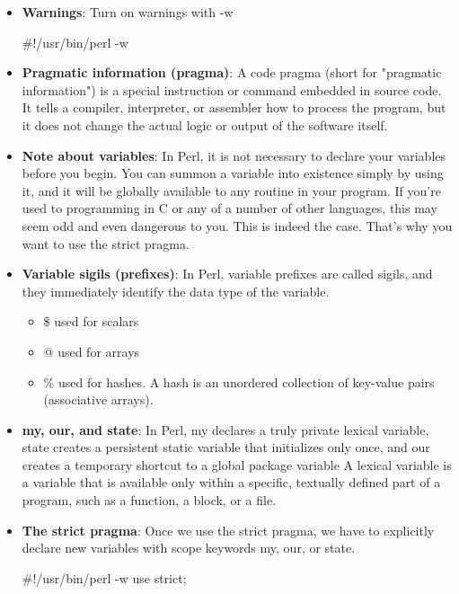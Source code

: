\documentclass{report}
\begin{document}
    \pagebreak 
    \begin{itemize}
        \item \textbf{Warnings}: Turn on warnings with -w
            \begin{perlcode}
                #!/usr/bin/perl -w
            \end{perlcode}

    \end{itemize}

    \pagebreak 
    \begin{itemize}
        \item \textbf{Pragmatic information (pragma)}: A code pragma (short for "pragmatic information") is a special instruction or command embedded in source code. It tells a compiler, interpreter, or assembler how to process the program, but it does not change the actual logic or output of the software itself.
        \item \textbf{Note about variables}: In Perl, it is not necessary to declare your variables before you begin. You can summon a variable into existence simply by using it, and it will be globally available to any routine in your program. If you’re used to programming in C or any of a number of other languages, this may seem odd and even dangerous to you. This is indeed the case. That’s why you want to use the strict pragma.
        \item \textbf{Variable sigils (prefixes)}: In Perl, variable prefixes are called sigils, and they immediately identify the data type of the variable.
            \begin{itemize}
                \item \$ used for scalars
                \item @ used for arrays
                \item \% used for hashes. A hash is an unordered collection of key-value pairs (associative arrays).
            \end{itemize}
        \item \textbf{my, our, and state}: In Perl, my declares a truly private lexical variable, state creates a persistent static variable that initializes only once, and our creates a temporary shortcut to a global package variable
            \bigbreak \noindent 
            A lexical variable is a variable that is available only within a specific, textually defined part of a program, such as a function, a block, or a file.
        \item \textbf{The strict pragma}: Once we use the strict pragma, we have to explicitly declare new variables with scope keywords my, our, or state.
            \bigbreak \noindent 
            \begin{perlcode}
                #!/usr/bin/perl -w
                use strict;


\end{perlcode}
\end{itemize}
\end{document}
